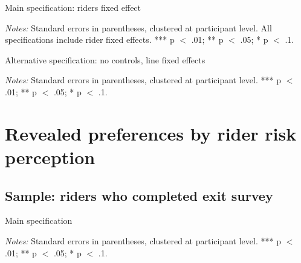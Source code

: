 \documentclass[12pt]{article}
\begin{document}
\begin{table}[H]
	\centering
	\caption{Main specification: riders fixed effect}
	\begin{adjustbox}{max width = \textwidth}
		\begin{threeparttable}
			
			\begin{tablenotes}
				\item  \footnotesize\textit{Notes:} Standard errors in parentheses, clustered at participant level. All specifications include rider fixed effects. *** p $<$ .01; ** p $<$ .05; * p $<$ .1.
			\end{tablenotes}
		\end{threeparttable}
	\end{adjustbox}
\end{table}

\begin{table}[H]
	\centering
	\caption{Alternative specification: no controls, line fixed effects }
	\begin{adjustbox}{max width = \textwidth}
		\begin{threeparttable}
			
			\begin{tablenotes}
				\item  \footnotesize\textit{Notes:} Standard errors in parentheses, clustered at participant level. *** p $<$ .01; ** p $<$ .05; * p $<$ .1.
			\end{tablenotes}
		\end{threeparttable}
	\end{adjustbox}
\end{table}

\section{Revealed preferences by rider risk perception}

\subsection{Sample: riders who completed exit survey}
\begin{table}[H]
	\centering
	\caption{Main specification}
	\begin{adjustbox}{max width = \textwidth}
		\begin{threeparttable}
			
			\begin{tablenotes}
				\item  \footnotesize\textit{Notes:} Standard errors in parentheses, clustered at participant level. *** p $<$ .01; ** p $<$ .05; * p $<$ .1.
			\end{tablenotes}
		\end{threeparttable}
	\end{adjustbox}
\end{table}
\end{document}

